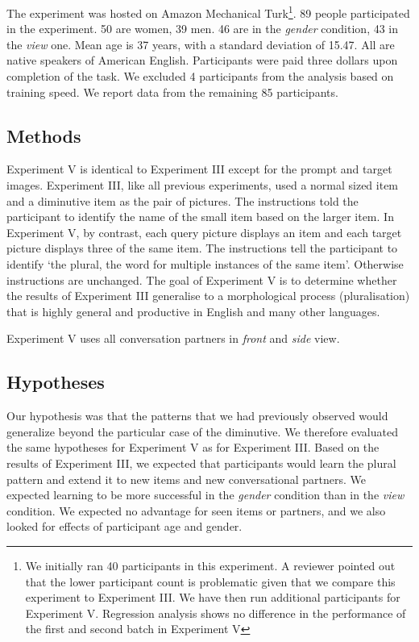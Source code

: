 \documentclass{frontiersSCNS} %
\begin{document}
The experiment was hosted on Amazon Mechanical Turk\footnote{We initially ran 40 participants in this experiment. A reviewer pointed out that the lower participant count is problematic given that we compare this experiment to Experiment III. We have then run additional participants for Experiment V. Regression analysis shows no difference in the performance of the first and second batch in Experiment V}. 89 people participated in the experiment. 50 are women, 39 men. 46 are in the \emph{gender} condition, 43 in the \emph{view} one. Mean age is 37 years, with a standard deviation of 15.47. All are native speakers of American English. Participants were paid three dollars upon completion of the task. We excluded 4 participants from the analysis based on training speed. We report data from the remaining 85 participants.

\subsection{Methods}

Experiment V is identical to Experiment III except for the prompt and target images. Experiment III, like all previous
experiments, used a normal sized item and a diminutive item as the pair of pictures. The instructions told the participant to
identify the name of the small item based on the larger item. In Experiment V, by contrast, each query picture displays an item and each target picture 
displays  three of the same item. The instructions tell the participant to identify `the plural, the word for multiple instances of the same
item'.  Otherwise instructions are unchanged. The goal of Experiment V is to determine whether the results of Experiment III generalise to a morphological process (pluralisation) that is highly general and productive in English and many other languages. 

Experiment V uses all conversation partners in {\it front} and {\it side} view.

\subsection{Hypotheses}

Our hypothesis was that the patterns that we had previously observed would generalize beyond the particular case of the diminutive.  We therefore evaluated the same hypotheses for Experiment V as for Experiment III. Based on the results of Experiment III, we expected that participants would learn the plural pattern  and extend it to new items and new conversational partners. We expected learning to be more successful in the \emph{gender} condition than in the \emph{view} condition. We expected no advantage for seen items or partners, and we also looked for effects of participant age and gender. 
\end{document}

